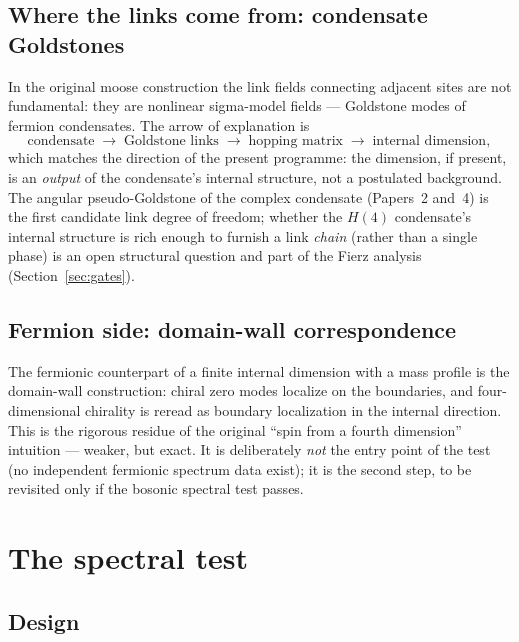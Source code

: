 \documentclass[11pt,a4paper]{article}
\begin{document}
\subsection{Where the links come from: condensate Goldstones}

In the original moose construction the link fields connecting
adjacent sites are not fundamental: they are nonlinear
sigma-model fields --- Goldstone modes of fermion condensates.
The arrow of explanation is
\begin{equation}
\text{condensate} \;\to\; \text{Goldstone links} \;\to\;
\text{hopping matrix} \;\to\; \text{internal dimension},
\label{eq:arrow}
\end{equation}
which matches the direction of the present programme: the
dimension, if present, is an \emph{output} of the condensate's
internal structure, not a postulated background.
The angular pseudo-Goldstone of the complex condensate
(Papers~2 and~4) is the first candidate link degree of freedom;
whether the $H(4)$ condensate's internal structure is rich enough
to furnish a link \emph{chain} (rather than a single phase) is an
open structural question and part of the Fierz analysis
(Section~\ref{sec:gates}).

\subsection{Fermion side: domain-wall correspondence}

The fermionic counterpart of a finite internal dimension with a
mass profile is the domain-wall construction: chiral zero modes
localize on the boundaries, and four-dimensional chirality is
reread as boundary localization in the internal direction.
This is the rigorous residue of the original ``spin from a fourth
dimension'' intuition --- weaker, but exact.
It is deliberately \emph{not} the entry point of the test
(no independent fermionic spectrum data exist); it is the second
step, to be revisited only if the bosonic spectral test passes.

\section{The spectral test}
\label{sec:test}

\subsection{Design}
\end{document}
